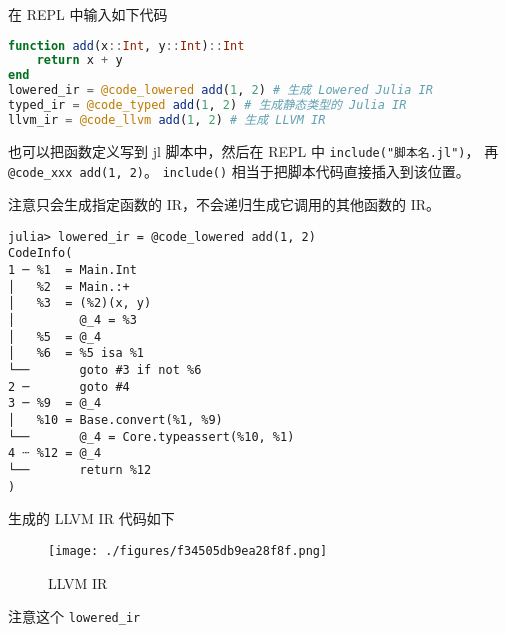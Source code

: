 在 REPL 中输入如下代码
\begin{lstlisting}[language=julia,caption=julia]
function add(x::Int, y::Int)::Int
    return x + y
end
lowered_ir = @code_lowered add(1, 2) # 生成 Lowered Julia IR
typed_ir = @code_typed add(1, 2) # 生成静态类型的 Julia IR
llvm_ir = @code_llvm add(1, 2) # 生成 LLVM IR
\end{lstlisting}

也可以把函数定义写到 jl 脚本中，然后在 REPL 中 \verb`include("脚本名.jl")`， 再 \verb`@code_xxx add(1, 2)`。 \verb`include()` 相当于把脚本代码直接插入到该位置。

注意只会生成指定函数的 IR，不会递归生成它调用的其他函数的 IR。

\begin{lstlisting}[language=none,caption=julia ir]
julia> lowered_ir = @code_lowered add(1, 2)
CodeInfo(
1 ─ %1  = Main.Int
│   %2  = Main.:+
│   %3  = (%2)(x, y)
│         @_4 = %3
│   %5  = @_4
│   %6  = %5 isa %1
└──       goto #3 if not %6
2 ─       goto #4
3 ─ %9  = @_4
│   %10 = Base.convert(%1, %9)
└──       @_4 = Core.typeassert(%10, %1)
4 ┄ %12 = @_4
└──       return %12
)
\end{lstlisting}

生成的 LLVM IR 代码如下
\begin{figure}[ht]
\centering
\texttt{[image: ./figures/f34505db9ea28f8f.png]}
\caption{LLVM IR} \label{fig_julia0_2}
\end{figure}

注意这个 \verb`lowered_ir` 